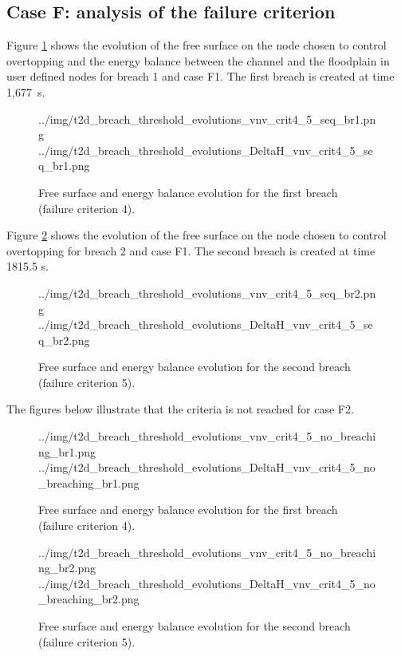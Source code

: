 \subsection{Case F: analysis of the failure criterion}
Figure \ref{fig:breach:crit4:F1} shows the evolution of the free surface
on the node chosen to control overtopping and the energy balance between
the channel and the floodplain in user defined nodes for breach 1 and case
F1. The first breach is created at time 1,677~s.
\begin{figure}[H]
 \centering
 {../img/t2d_breach_threshold_evolutions_vnv_crit4_5_seq_br1.png}
 {../img/t2d_breach_threshold_evolutions_DeltaH_vnv_crit4_5_seq_br1.png}
 \caption{Free surface and energy balance evolution for the first breach
 (failure criterion 4).}
 \label{fig:breach:crit4:F1}
\end{figure}
Figure \ref{fig:breach:crit5:F1} shows the evolution of the free surface on the
node chosen to control overtopping for breach 2 and case F1. The second breach
is created at time 1815.5 s.
\begin{figure}[H]
 \centering
 {../img/t2d_breach_threshold_evolutions_vnv_crit4_5_seq_br2.png}
 {../img/t2d_breach_threshold_evolutions_DeltaH_vnv_crit4_5_seq_br2.png}
 \caption{Free surface and energy balance evolution for the second breach
 (failure criterion 5).}
 \label{fig:breach:crit5:F1}
\end{figure}
The figures below illustrate that the criteria is not reached for case F2.
\begin{figure}[H]
 \centering
 {../img/t2d_breach_threshold_evolutions_vnv_crit4_5_no_breaching_br1.png}
 {../img/t2d_breach_threshold_evolutions_DeltaH_vnv_crit4_5_no_breaching_br1.png}
 \caption{Free surface and energy balance evolution for the first breach
 (failure criterion 4).}
 \label{fig:breach:crit4:F2}
\end{figure}
\begin{figure}[H]
 \centering
 {../img/t2d_breach_threshold_evolutions_vnv_crit4_5_no_breaching_br2.png}
 {../img/t2d_breach_threshold_evolutions_DeltaH_vnv_crit4_5_no_breaching_br2.png}
 \caption{Free surface and energy balance evolution for the second breach
  (failure criterion 5).}
 \label{fig:breach:crit5:F2}
\end{figure}

